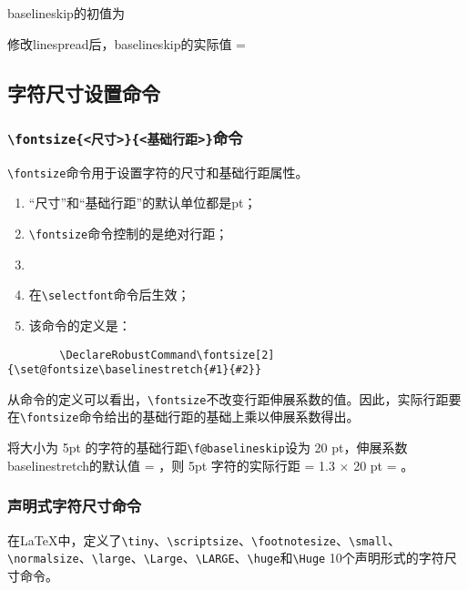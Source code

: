 \documentclass{ctexart}
\newcommand{\cmd}[1]{\texttt{\textbackslash #1}}
\newcommand{\myemph}[1]{{\heiti{#1}}}
\begin{document}
	\begin{LTXexample}[width = .35\linewidth, caption = \cmd{linespread}影响\cmd{baselineskip}实际值示例]
		baselineskip的初值为 \printlength{\baselineskip}
		\par \linespread{1.8}\selectfont
		修改linespread后，baselineskip的实际值 =\\
		\printlength{\baselineskip}
	\end{LTXexample}
	
	\subsection{字符尺寸设置命令}
	
	\subsubsection{\cmd{fontsize\{<尺寸>\}\{<基础行距>\}}命令}
	\cmd{fontsize}命令用于设置字符的尺寸和基础行距属性。
	
	\begin{enumerate}
		\item “尺寸”和“基础行距”的默认单位都是pt；
		\item \cmd{fontsize}命令控制的是绝对行距；
		\item \myemph{实际行距 = 伸展系数 $\times$ 基础行距；}
		\item 在\cmd{selectfont}命令后生效；
		\item 该命令的定义是：
	\end{enumerate}
	
	\begin{lstlisting}
		\DeclareRobustCommand\fontsize[2]  {\set@fontsize\baselinestretch{#1}{#2}}
	\end{lstlisting}
	
	从命令的定义可以看出，\cmd{fontsize}不改变行距伸展系数的值。因此，实际行距要在\cmd{fontsize}命令给出的基础行距的基础上乘以伸展系数得出。
	
	\begin{LTXexample}[width = .35\linewidth, caption = \cmd{fontsize}修改基础行距示例]
		\fontsize{5}{20}\selectfont
		将大小为 5pt 的字符的基础行距\cmd{f@baselineskip}设为 20 pt，伸展系数baselinestretch的默认值 = \baselinestretch，则 5pt 字符的实际行距 = 1.3 $\times$ 20 pt = \printlength{\baselineskip}。
		
	\end{LTXexample}
	
	\subsubsection{声明式字符尺寸命令}
	在\LaTeX 中，定义了\cmd{tiny}、\cmd{scriptsize}、\cmd{footnotesize}、\cmd{small}、\cmd{normalsize}、\cmd{large}、\cmd{Large}、\cmd{LARGE}、\cmd{huge}和\cmd{Huge} 10个声明形式的字符尺寸命令。
	
\end{document}
